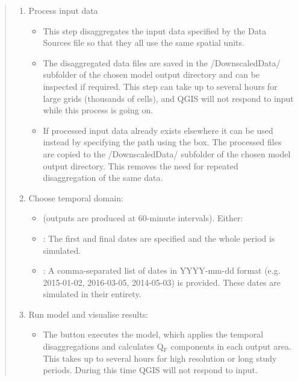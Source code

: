 \documentclass[letterpaper,10pt,english]{sphinxmanual}
\begin{document}
\begin{itemize}
\begin{quote}
\begin{enumerate}
\item {} 
Process input data
\begin{itemize}
\item {} 
This step disaggregates the input data specified by the Data Sources file so that they all use the same spatial units.

\item {} 
The disaggregated data files are saved in the /DownscaledData/ subfolder of the chosen model output directory and can be inspected if required. This step can take up to several hours for large grids (thousands of cells), and QGIS will not respond to input while this process is going on.

\item {} 
If processed input data already exists elsewhere it can be used instead by specifying the path using the  box. The processed files are copied to the /DownscaledData/ subfolder of the chosen model output directory. This removes the need for repeated disaggregation of the same data.

\end{itemize}

\item {} 
Choose temporal domain:
\begin{itemize}
\item {} 
 (outputs are produced at 60-minute intervals). Either:

\item {} 
: The first and final dates are specified and the whole period is simulated.

\item {} 
: A comma-separated list of dates in YYYY-mm-dd format (e.g. 2015-01-02, 2016-03-05, 2014-05-03) is provided. These dates are simulated in their entirety.

\end{itemize}

\item {} 
Run model and visualise results:
\begin{itemize}
\item {} 
The  button executes the model, which applies the temporal disaggregations and calculates Q$_{\text{F}}$ components in each output area. This takes up to several hours for high resolution or long study periods. During this time QGIS will not respond to input.


\end{itemize}
\end{enumerate}
\end{quote}
\end{itemize}
\end{document}
